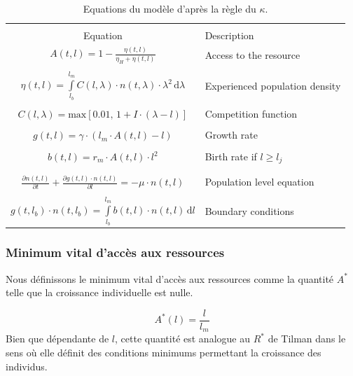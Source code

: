 \begin{table}
\centering
\caption{\label{tab:ANEq} Equations du modèle d'après la règle du $\kappa$.}
\begin{tabular}{cl}
\hline 
\hline
&\\
Equation & Description \\
\hline
	$\displaystyle{A(t,l)=1-\frac{\eta(t,l)}{\eta_{H}+\eta(t,l)}}$ & Access to the
	resource\\
	&\\
	$\displaystyle{\eta (t,l) = \int\limits_{l_b}^{l_m} C(l,\lambda)\cdot
	n(t,\lambda)\cdot \lambda^2\,\text{d}\lambda}$ & Experienced population
	density\\
	&\\
	$\displaystyle{C(l,\lambda) = \text{max}[0.01,\, 1+I\cdot(\lambda-l)]}$ &
	Competition function \\
	&\\
	$\displaystyle{g(t,l) = \gamma\cdot(l_m \cdot A(t,l)-l)}$ & Growth rate\\
	&\\
	$\displaystyle{b(t,l) = r_m \cdot A(t,l)\cdot l^2}$ & Birth rate if $l\geq
	l_j$\\
	&\\
	&\\
	$\displaystyle{\frac{\partial n(t,l)}{\partial t}+ \frac{\partial
	g(t,l)\cdot n(t,l)}{\partial l} = -\mu \cdot n(t,l) }$ & Population level
	equation\\
	&\\
	$\displaystyle{g(t,l_b)\cdot n(t,l_b) = \int\limits_{l_b}^{l_m} b(t,l)\cdot
	n(t,l) \, \text{d}l}$ & Boundary conditions \\
\hline 
\end{tabular} 
\end{table}

\subsubsection{Minimum vital d'accès aux ressources}
Nous définissons le minimum vital d'accès aux ressources comme la quantité $A^*$
telle que la croissance individuelle est nulle.

\begin{equation}
\label{eq_an4}
A^*(l) = \frac{l}{l_m}
\end{equation}
Bien que dépendante de $l$,
cette quantité est analogue au $R^*$ de Tilman dans le sens où elle définit des
conditions minimums permettant la croissance des individus. 

